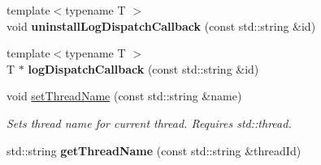 \begin{DoxyCompactItemize}
\item 
\hypertarget{classel_1_1base_1_1Storage_a34c2c9f8abff647e22e1ee0b52357f88}{{\footnotesize template$<$typename T $>$ }\\void {\bfseries uninstall\-Log\-Dispatch\-Callback} (const std\-::string \&id)}\label{classel_1_1base_1_1Storage_a34c2c9f8abff647e22e1ee0b52357f88}

\item 
\hypertarget{classel_1_1base_1_1Storage_a408d2420169a7f7286552fd153967b8d}{{\footnotesize template$<$typename T $>$ }\\T $\ast$ {\bfseries log\-Dispatch\-Callback} (const std\-::string \&id)}\label{classel_1_1base_1_1Storage_a408d2420169a7f7286552fd153967b8d}

\item 
\hypertarget{classel_1_1base_1_1Storage_a1800a786d72b003997dd8d2599b040e0}{void \hyperlink{classel_1_1base_1_1Storage_a1800a786d72b003997dd8d2599b040e0}{set\-Thread\-Name} (const std\-::string \&name)}\label{classel_1_1base_1_1Storage_a1800a786d72b003997dd8d2599b040e0}

\begin{DoxyCompactList}\small\item\em Sets thread name for current thread. Requires std\-::thread. \end{DoxyCompactList}\item 
\hypertarget{classel_1_1base_1_1Storage_aefa8cd1b921eab81d233ae8c5a79f3ee}{std\-::string {\bfseries get\-Thread\-Name} (const std\-::string \&thread\-Id)}\label{classel_1_1base_1_1Storage_aefa8cd1b921eab81d233ae8c5a79f3ee}

\end{DoxyCompactItemize}
